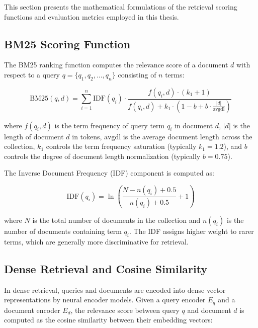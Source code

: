 This section presents the mathematical formulations of the retrieval scoring functions and evaluation metrics employed in this thesis.

\subsection{BM25 Scoring Function}
\label{sec:bm25_math}

The BM25 ranking function \cite{robertson_2009_probabilistic} computes the relevance score of a document $d$ with respect to a query $q = \{q_1, q_2, \ldots, q_n\}$ consisting of $n$ terms:

\begin{equation}
\text{BM25}(q, d) = \sum_{i=1}^{n} \text{IDF}(q_i) \cdot \frac{f(q_i, d) \cdot (k_1 + 1)}{f(q_i, d) + k_1 \cdot \left(1 - b + b \cdot \frac{|d|}{\text{avgdl}}\right)}
\label{eq:bm25}
\end{equation}

\noindent where $f(q_i, d)$ is the term frequency of query term $q_i$ in document $d$, $|d|$ is the length of document $d$ in tokens, $\text{avgdl}$ is the average document length across the collection, $k_1$ controls the term frequency saturation (typically $k_1 = 1.2$), and $b$ controls the degree of document length normalization (typically $b = 0.75$).

The Inverse Document Frequency (IDF) component is computed as:

\begin{equation}
\text{IDF}(q_i) = \ln\left(\frac{N - n(q_i) + 0.5}{n(q_i) + 0.5} + 1\right)
\label{eq:idf}
\end{equation}

\noindent where $N$ is the total number of documents in the collection and $n(q_i)$ is the number of documents containing term $q_i$. The IDF assigns higher weight to rarer terms, which are generally more discriminative for retrieval.

\subsection{Dense Retrieval and Cosine Similarity}
\label{sec:cosine_math}

In dense retrieval, queries and documents are encoded into dense vector representations by neural encoder models. Given a query encoder $E_q$ and a document encoder $E_d$, the relevance score between query $q$ and document $d$ is computed as the cosine similarity between their embedding vectors:

